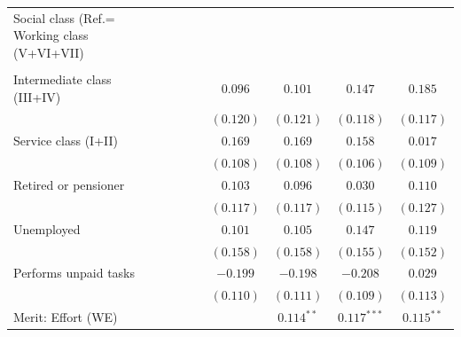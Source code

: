 \documentclass[
  12pt,
]{article}
\begin{document}
\begin{table}
\begin{center}
{\begin{tabular}{l c c c c c c c}
Social class (Ref.= Working class (V+VI+VII)          &                &                &                &                &                &               &                \\
                                                      &                &                &                &                &                &               &                \\
\quad Intermediate class (III+IV)                     &                &                &                & $0.096$        & $0.101$        & $0.147$       & $0.185$        \\
                                                      &                &                &                & $(0.120)$      & $(0.121)$      & $(0.118)$     & $(0.117)$      \\
\quad Service class (I+II)                            &                &                &                & $0.169$        & $0.169$        & $0.158$       & $0.017$        \\
                                                      &                &                &                & $(0.108)$      & $(0.108)$      & $(0.106)$     & $(0.109)$      \\
\quad Retired or pensioner                            &                &                &                & $0.103$        & $0.096$        & $0.030$       & $0.110$        \\
                                                      &                &                &                & $(0.117)$      & $(0.117)$      & $(0.115)$     & $(0.127)$      \\
\quad Unemployed                                      &                &                &                & $0.101$        & $0.105$        & $0.147$       & $0.119$        \\
                                                      &                &                &                & $(0.158)$      & $(0.158)$      & $(0.155)$     & $(0.152)$      \\
\quad Performs unpaid tasks                           &                &                &                & $-0.199$       & $-0.198$       & $-0.208$      & $0.029$        \\
                                                      &                &                &                & $(0.110)$      & $(0.111)$      & $(0.109)$     & $(0.113)$      \\
Merit: Effort (WE)                                    &                &                &                &                & $0.114^{**}$   & $0.117^{***}$ & $0.115^{**}$   \\

\end{tabular}}
\end{center}
\end{table}
\end{document}
